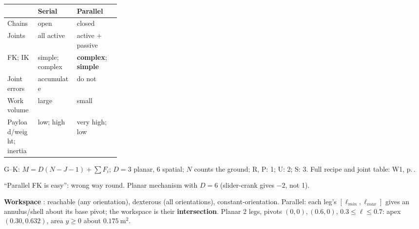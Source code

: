 \begin{multicols}{3}

\begin{fbx}
\begin{tabularx}{\linewidth}{@{}p{0.27\linewidth}XX@{}}\toprule
 & \textbf{Serial} & \textbf{Parallel}\\\midrule
Chains & open & closed\\
Joints & all active & active + passive\\
FK; IK & simple; complex & \textbf{complex}; \textbf{simple}\\
Joint errors & accumulate & do not\\
Work volume & large & small\\
Payload/weight; inertia & low; high & very high; low\\\bottomrule
\end{tabularx}
\end{fbx}
G--K: $M=D(N-J-1)+\sum F_i$; $D=3$ planar, 6 spatial; $N$ counts the ground; R, P: 1; U: 2; S: 3. Full recipe and joint table: W1, p.\,\pageref{p:W1}.
\begin{trap}
``Parallel FK is easy'': wrong way round. Planar mechanism with $D=6$ (slider-crank gives $-2$, not 1). \chk
\end{trap}
\textbf{Workspace} : reachable (any orientation), dexterous (all orientations), constant-orientation. Parallel: each leg's $[\ell_{min},\ell_{max}]$ gives an annulus/shell about its base pivot; the workspace is their \textbf{intersection}. Planar 2 legs, pivots $(0,0),(0.6,0)$, $0.3\le\ell\le0.7$: apex $(0.30,0.632)$, area $y\ge0$ about $0.175\ \mathrm{m^2}$. \chk
\begin{center}
\end{center}
\end{multicols}
